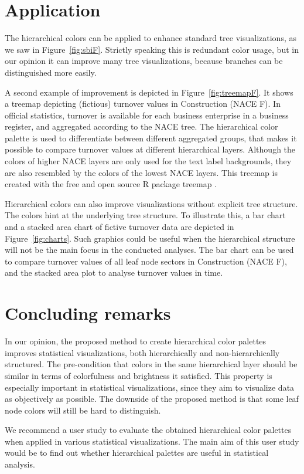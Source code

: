 \documentclass[review]{vgtc}                 %
\begin{document}
\section{Application}
The hierarchical colors can be applied to enhance standard tree visualizations, as we saw in Figure~\ref{fig:sbiF}. Strictly speaking this is redundant color usage, but in our opinion it can improve many tree visualizations, because branches can be distinguished more easily. 

A second example of improvement is depicted in Figure~\ref{fig:treemapF}. It shows a treemap depicting (fictious) turnover values in Construction (NACE F). In official statistics, turnover is available for each business enterprise in a business register, and aggregated according to the NACE tree. The hierarchical color palette is used to differentiate between different aggregated groups, that makes it possible to compare turnover values at different hierarchical layers. Although the colors of higher NACE layers are only used for the text label backgrounds, they are also resembled by the colors of the lowest NACE layers. This treemap is created with the free and open source R package treemap \cite{treemap}.

Hierarchical colors can also improve visualizations without explicit tree structure. The colors hint at the underlying tree structure.
To illustrate this, a bar chart and a stacked area chart of fictive turnover data are depicted in Figure~\ref{fig:charts}. Such graphics could be useful when the hierarchical structure will not be the main focus in the conducted analyses. The bar chart can be used to compare turnover values of all leaf node sectors in Construction (NACE F), and the stacked area plot to analyse turnover values in time.

\section{Concluding remarks}
In our opinion, the proposed method to create hierarchical color palettes improves statistical visualizations, both hierarchically and non-hierarchically structured. The pre-condition that colors in the same hierarchical layer should be similar in terms of colorfulness and brightness it satisfied. This property is especially important in statistical visualizations, since they aim to visualize data as objectively as possible. The downside of the proposed method is that some leaf node colors will still be hard to distinguish.

We recommend a user study to evaluate the obtained hierarchical color palettes when applied in various statistical visualizations. The main aim of this user study would be to find out whether hierarchical palettes are useful in statistical analysis.





\end{document}
